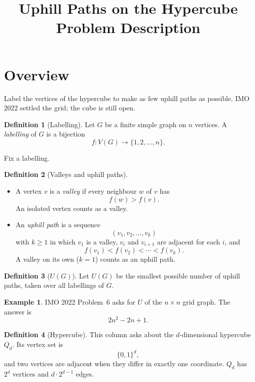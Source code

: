 \documentclass[11pt]{article}
\title{Uphill Paths on the Hypercube\\[0.4em]\large Problem Description}
\author{}
\date{}
\theoremstyle{definition}
\newtheorem*{definition}{Definition}
\newtheorem*{example}{Example}
\begin{document}
\maketitle

\section*{Overview}

Label the vertices of the hypercube to make as few uphill paths as
possible. IMO 2022 settled the grid; the cube is still open.

\begin{definition}[Labelling]
Let $G$ be a finite simple graph on $n$ vertices. A \emph{labelling}
of $G$ is a bijection
\[
  f \colon V(G) \longrightarrow \{1, 2, \ldots, n\}.
\]
\end{definition}

Fix a labelling.

\begin{definition}[Valleys and uphill paths]
\leavevmode
\begin{itemize}[leftmargin=*]
  \item A vertex $v$ is a \emph{valley} if every neighbour $w$ of $v$
    has
    \[
      f(w) > f(v).
    \]
    An isolated vertex counts as a valley.
  \item An \emph{uphill path} is a sequence
    \[
      (v_1, v_2, \ldots, v_k)
    \]
    with $k \geq 1$ in which $v_1$ is a valley, $v_i$ and $v_{i+1}$
    are adjacent for each $i$, and
    \[
      f(v_1) < f(v_2) < \cdots < f(v_k).
    \]
    A valley on its own ($k = 1$) counts as an uphill path.
\end{itemize}
\end{definition}

\begin{definition}[$U(G)$]
Let $U(G)$ be the smallest possible number of uphill paths, taken
over all labellings of $G$.
\end{definition}

\begin{example}
IMO 2022 Problem~6 asks for $U$ of the $n \times n$ grid graph. The
answer is
\[
  2n^2 - 2n + 1.
\]
\end{example}

\begin{definition}[Hypercube]
This column asks about the $d$-dimensional hypercube $Q_d$. Its
vertex set is
\[
  \{0, 1\}^d,
\]
and two vertices are adjacent when they differ in exactly one
coordinate. $Q_d$ has $2^d$ vertices and $d \cdot 2^{d-1}$ edges.
\end{definition}
\end{document}
